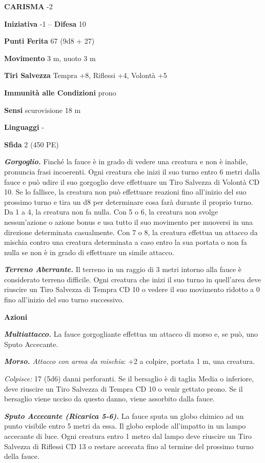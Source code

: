 \begin{multicols}{2}
\textbf{CARISMA} -2

\textbf{Iniziativa} -1 -- \textbf{Difesa} 10

\textbf{Punti Ferita} 67 (9d8 + 27)

\textbf{Movimento} 3 m, nuoto 3 m

\textbf{Tiri Salvezza} Tempra +8, Riflessi +4, Volontà +5

\textbf{Immunità alle Condizioni} prono

\textbf{Sensi} scurovisione 18 m

\textbf{Linguaggi} -

\textbf{Sfida} 2 (450 PE)

\emph{\textbf{Gorgoglio.}} Finché la fauce è in grado di vedere una creatura e non è inabile, pronuncia frasi incoerenti. Ogni creatura che inizi il suo turno entro 6 metri dalla fauce e può udire il suo gorgoglio deve effettuare un Tiro Salvezza di Volontà CD 10. Se lo fallisce, la creatura non può effettuare reazioni fino all'inizio del suo prossimo turno e tira un d8 per determinare cosa farà durante il proprio turno. Da 1 a 4, la creatura non fa nulla. Con 5 o 6, la creatura non svolge nessun'azione o azione bonus e usa tutto il suo movimento per muoversi in una direzione determinata casualmente. Con 7 o 8, la creatura effettua un attacco da mischia contro una creatura determinata a caso entro la sua portata o non fa nulla se non è in grado di effettuare un simile attacco.

\emph{\textbf{Terreno Aberrante.}} Il terreno in un raggio di 3 metri intorno alla fauce è considerato terreno difficile. Ogni creatura che inizi il suo turno in quell'area deve riuscire un Tiro Salvezza di Tempra CD 10 o vedere il suo movimento ridotto a 0 fino all'inizio del suo turno successivo.

\textbf{Azioni}

\emph{\textbf{Multiattacco.}} La fauce gorgogliante effettua un attacco di morso e, se può, uno Sputo Accecante.

\emph{\textbf{Morso.} Attacco con arma da mischia}: +2 a colpire, portata 1 m, una creatura.

\emph{Colpisce:} 17 (5d6) danni perforanti. Se il bersaglio è di taglia Media o inferiore, deve riuscire un Tiro Salvezza di Tempra CD 10 o venir gettato prono. Se il bersaglio viene ucciso da questo danno, viene assorbito dalla fauce.

\emph{\textbf{Sputo Accecante (Ricarica 5-6).}} La fauce sputa un globo chimico ad un punto visibile entro 5 metri da essa. Il globo esplode all'impatto in un lampo accecante di luce. Ogni creatura entro 1 metro dal lampo deve riuscire un Tiro Salvezza di Riflessi CD 13 o restare accecata fino al termine del prossimo turno della fauce.


\end{multicols}
